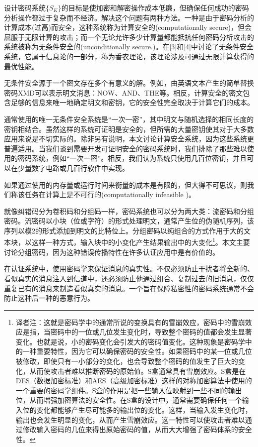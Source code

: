 \documentclass[]{article}
\begin{document}
	
	设计密码系统$\{S_K\}$的目标是使加密和解密操作成本低廉，但确保任何成功的密码分析操作都过于复杂而不经济。解决这个问题有两种方法。一种是由于密码分析的计算成本(过高)而安全，这种系统称为计算安全的(computationally secure)，但会屈服于无限计算的攻击；而一个无论允许多少计算量都能抵抗任何密码分析攻击的系统被称为无条件安全的(unconditionally secure.)。在[3]和[4]中讨论了无条件安全系统，它属于信息论的一部分，称为香农理论，该理论涉及可通过无限计算获得的最优性能。
	
	无条件安全源于一个密文存在多个有意义的解。例如，由英语文本产生的简单替换密码XMD可以表示明文消息：NOW、AND、THE等。相反，计算安全的密文包含足够的信息来唯一地确定明文和密钥，它的安全性完全取决于计算它们的成本。
	
	
	通常使用的唯一无条件安全系统是“一次一密”，其中明文与随机选择的相同长度的密钥相结合。虽然这样的系统可证明是安全的，但所需的大量密钥使其对于大多数应用来说是不切实际的。除非另有说明，本文讨论计算安全系统，因为这些系统更普遍适用。当我们谈到需要开发可证明安全的密码系统时，我们排除了那些难以使用的密码系统，例如“一次一密”。相反，我们认为系统只使用几百位密钥，并且可以在少量数字电路或几百行软件中实现。
	
	如果通过使用的内存量或运行时间来衡量的成本是有限的，但大得不可思议，则我们称该任务在计算上是不可行的(computationally infeasible )。
	
	就像纠错码分为卷积码和分组码一样，密码系统也可以分为两大类：流密码和分组密码。流密码以小块（位或字符）的形式处理明文，通常产生位的伪随机序列，该序列以模2的形式添加到明文的比特位上。分组密码以纯组合的方式作用于大的文本块，以这样一种方式，输入块中的小变化产生结果输出中的大变化\footnote{译者注：这就是密码学中的通常所说的变换具有的雪崩效应，密码中的雪崩效应是指，当密码中的一位或几位发生变化时，导致整个密码的值都会发生显著变化。也就是说，小的密码变化会引发大的密码值变化。这种现象是密码学中的一种重要特性，因为它可以确保密码的安全性。如果密码中的某一位或几位被修改，即使只有一小部分的变化，也会导致整个密码的值发生了巨大的变化，从而使攻击者难以推断密码的原始值。S盒通常具有雪崩效应。S盒是在DES（数据加密标准）和AES（高级加密标准）这样的对称加密算法中使用的一个重要的密码学组件。S盒的作用是把一些输入位映射到一些不同的输出位，从而增强加密算法的安全性。在S盒的设计中，通常需要确保任何一个输入位的变化都能够产生尽可能多的输出位的变化。这样，当输入发生变化时，输出也会发生明显的变化，从而产生雪崩效应。这一特性可以使攻击者难以通过修改输入密码的几位来得出原始密码的值，从而大大增强了密码体系的安全性。}。本文主要讨论分组密码，因为这种错误传播特性在许多认证应用中是有价值的。
	
	
	在认证系统中，使用密码学来保证消息的真实性。不仅必须防止干扰者将全新的、看似真实的消息注入到信道中，还必须防止他通过组合、复制过去的旧消息，仅仅重复已有的消息来制造看似真实的消息。一个旨在保障私密性的密码系统通常不会防止这种后一种的恶意行为。
	
\end{document}
